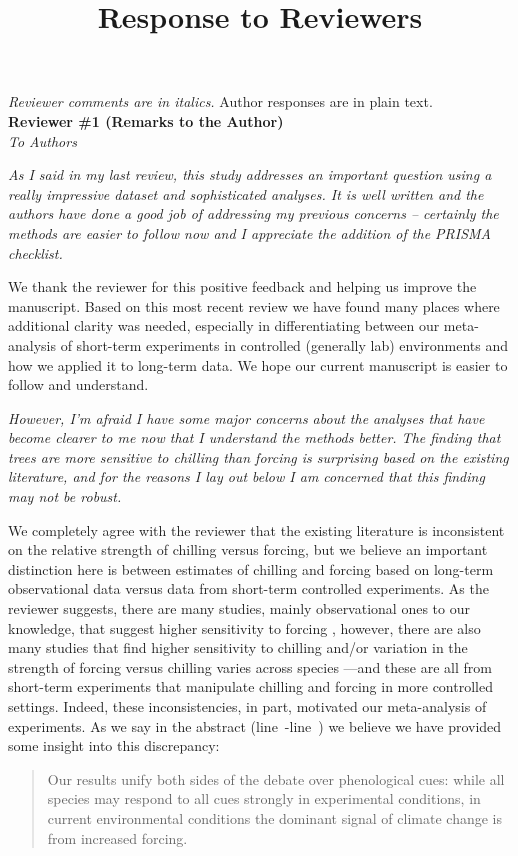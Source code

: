 \documentclass{article}
\newcommand{\lr}[1]{line~\lineref{#1}}
\begin{document}


\setlength\parindent{0pt}


\title{Response to Reviewers}
\emph{Reviewer comments are in italics.} Author responses are in plain text.\\

{\bf Reviewer \#1 (Remarks to the Author)}\\

\emph{To Authors}

\emph{As I said in my last review, this study addresses an important question using a really impressive
dataset and sophisticated analyses. It is well written and the authors have done a good job of
addressing my previous concerns -- certainly the methods are easier to follow now and I appreciate
the addition of the PRISMA checklist.}

We thank the reviewer for this positive feedback and helping us improve the manuscript. Based on this most recent review we have found many places where additional clarity was needed, especially in differentiating between our meta-analysis of short-term experiments in controlled (generally lab) environments and how we applied it to long-term data. We hope our current manuscript is easier to follow and understand.

\emph{However, I'm afraid I have some major concerns about the analyses that have become clearer to me
now that I understand the methods better. The finding that trees are more sensitive to chilling than
forcing is surprising based on the existing literature, and for the reasons I lay out below I am
concerned that this finding may not be robust.}

We completely agree with the reviewer that the existing literature is inconsistent on the relative strength of chilling versus forcing, but we believe an important distinction here is between estimates of chilling and forcing based on long-term observational data versus data from short-term controlled experiments. As the reviewer suggests, there are many studies, mainly observational ones to our knowledge, that suggest higher sensitivity to forcing \citep[e.g., ][]{fu2012,Rutishauser:2008},  however, there are also many studies that find higher sensitivity to chilling \citep[e.g., ][]{zohner2016, Laube:2014a,Heide:2005aa} and/or variation in the strength of forcing versus chilling varies across species \citep[e.g.,][]{harrington2015,Basler:2014aa,Caffarra:2011a,Caffarra:2011b,koerner2010a}---and these are all from short-term experiments that manipulate chilling and forcing in more controlled settings. Indeed, these inconsistencies, in part, motivated our meta-analysis of experiments. As we say in the abstract (\lr{unifydebatestart}-\lr{unifydebateend}) we believe we have provided some insight into this discrepancy:
\begin{quote}
Our results unify both sides of the debate over phenological cues: while all species may respond to all cues strongly in experimental conditions, in current environmental conditions the dominant signal of climate change is from increased forcing. 
\end{quote}
\end{document}
